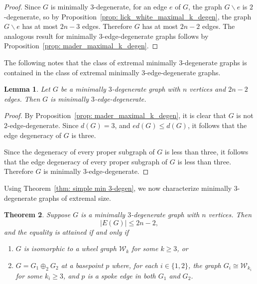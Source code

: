 \documentclass{amsart}
\newcommand{\ba}{\backslash}
\newcommand{\romannum}[1]{\romannumeral#1\relax}
\newtheorem{theorem}{Theorem}[section]
\newtheorem{lemma}[theorem]{Lemma}
\theoremstyle{definition}
\theoremstyle{remark}
\numberwithin{equation}{section}
\begin{document}
\begin{proof}
Since $G$ is minimally $3$-degenerate, for an edge $e$ of $G$, the graph $G \ba e$ is $2$-degenerate, so by Proposition~\ref{prop: lick_white_maximal_k_degen}, the graph $G \ba e$ has at most $2n-3$ edges. Therefore $G$ has at most $2n-2$ edges. The analogous result for minimally $3$-edge-degenerate graphs follows by Proposition~\ref{prop: mader_maximal_k_degen}.  
\end{proof}

The following notes that the class of extremal minimally $3$-degenerate graphs is contained in the class of extremal minimally $3$-edge-degenerate graphs. 

\begin{lemma}
\label{lem: min_3_degen_implies_min_3_edge_degenerate}
Let $G$ be a minimally $3$-degenerate graph with $n$ vertices and $2n-2$ edges. Then $G$ is minimally $3$-edge-degenerate.
\end{lemma}

\begin{proof}
By Proposition~\ref{prop: mader_maximal_k_degen}, it is clear that $G$ is not $2$-edge-degenerate. Since $d(G)=3$, and $ed(G) \leq d(G)$, it follows that the edge degeneracy of $G$ is three. 

Since the degeneracy of every proper subgraph of $G$ is less than three, it follows that the edge degeneracy of every proper subgraph of $G$ is less than three. Therefore $G$ is minimally $3$-edge-degenerate. 
\end{proof}

Using Theorem~\ref{thm: simple min 3-degen}, we now characterize minimally $3$-degenerate graphs of extremal size.  

\begin{theorem}
\label{thm: simple min 3-degen_graphs}
Suppose $G$ is a minimally $3$-degenerate graph with $n$ vertices. Then \[|E(G)|\leq 2n-2,\]
and the equality is attained if and only if

\begin{enumerate}
\item[(\romannum{1})] $G$ is isomorphic to a wheel graph $\mathcal{W}_k$ for some $k\geq 3$, or 

\item[(\romannum{2})] $G=G_1\oplus_2 G_2$ at a basepoint $p$ where, for each $i\in \{1,2\}$, the graph $G_i \cong \mathcal{W}_{k_i}$ for some $k_i \geq 3$, and $p$ is a spoke edge in both $G_1$ and $G_2$.
\end{enumerate}
\end{theorem}
\end{document}

